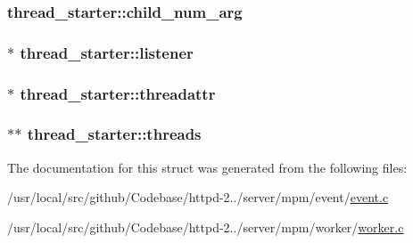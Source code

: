 \subsubsection[{\texorpdfstring{child\+\_\+num\+\_\+arg}{child_num_arg}}]{ thread\+\_\+starter\+::child\+\_\+num\+\_\+arg}\hypertarget{structthread__starter_a99c153b06b26e637a09baf75bc4df72c}{}\label{structthread__starter_a99c153b06b26e637a09baf75bc4df72c}
\subsubsection[{\texorpdfstring{listener}{listener}}]{ $\ast$ thread\+\_\+starter\+::listener}\hypertarget{structthread__starter_acacd48c396b6aa583c205f9ee2b60a01}{}\label{structthread__starter_acacd48c396b6aa583c205f9ee2b60a01}
\subsubsection[{\texorpdfstring{threadattr}{threadattr}}]{ $\ast$ thread\+\_\+starter\+::threadattr}\hypertarget{structthread__starter_a6aa5615e34d5142e6939afa0121233eb}{}\label{structthread__starter_a6aa5615e34d5142e6939afa0121233eb}
\subsubsection[{\texorpdfstring{threads}{threads}}]{ $\ast$$\ast$ thread\+\_\+starter\+::threads}\hypertarget{structthread__starter_a7a51fbe5bdaf8b26340e795f2ce94299}{}\label{structthread__starter_a7a51fbe5bdaf8b26340e795f2ce94299}


The documentation for this struct was generated from the following files\+:\begin{DoxyCompactItemize}
\item 
/usr/local/src/github/\+Codebase/httpd-\/2../server/mpm/event/\hyperlink{event_8c}{event.\+c}\item 
/usr/local/src/github/\+Codebase/httpd-\/2../server/mpm/worker/\hyperlink{worker_8c}{worker.\+c}\end{DoxyCompactItemize}
